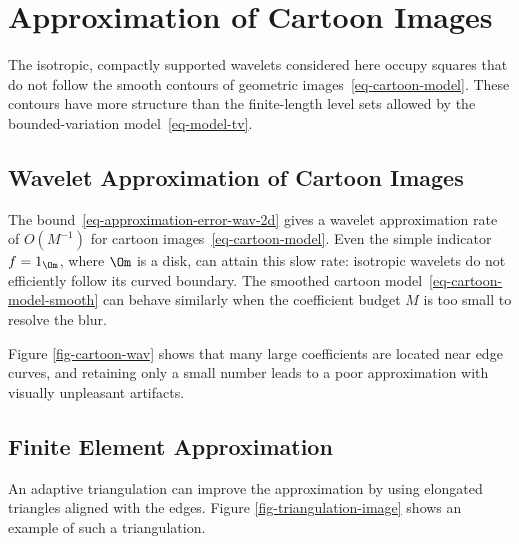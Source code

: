 
\section{Approximation of Cartoon Images}

The isotropic, compactly supported wavelets considered here occupy squares that do not follow the smooth contours of geometric images~\eqref{eq-cartoon-model}. These contours have more structure than the finite-length level sets allowed by the bounded-variation model~\eqref{eq-model-tv}.

\subsection{Wavelet Approximation of Cartoon Images}

The bound~\eqref{eq-approximation-error-wav-2d} gives a wavelet approximation rate of $O(M^{-1})$ for cartoon images~\eqref{eq-cartoon-model}. Even the simple indicator $f=1_\Om$, where $\Om$ is a disk, can attain this slow rate: isotropic wavelets do not efficiently follow its curved boundary. The smoothed cartoon model~\eqref{eq-cartoon-model-smooth} can behave similarly when the coefficient budget $M$ is too small to resolve the blur.

Figure \ref{fig-cartoon-wav} shows that many large coefficients are located near edge curves, and retaining only a small number leads to a poor approximation with visually unpleasant artifacts.



\subsection{Finite Element Approximation}

An adaptive triangulation can improve the approximation by using elongated triangles aligned with the edges.
Figure \ref{fig-triangulation-image} shows an example of such a triangulation.

